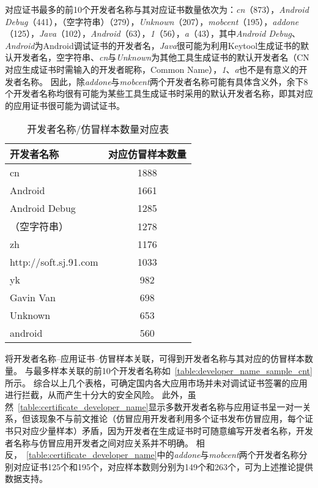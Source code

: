 对应证书最多的前10个开发者名称与其对应证书数量依次为：\emph{cn}（873），\emph{Android Debug}（441），（空字符串）（279），\emph{Unknown}（207），\emph{mobcent}（195），\emph{addone}（125），\emph{Java}（102），\emph{Android}（63），\emph{1}（56），\emph{a}（43），其中\emph{Android Debug}、\emph{Android}为Android调试证书的开发者名，\emph{Java}很可能为利用Keytool生成证书的默认开发者名，空字符串、\emph{cn}与\emph{Unknown}为其他工具生成证书的默认开发者名（CN对应生成证书时需输入的开发者昵称，Common Name），\emph{1}、\emph{a}也不是有意义的开发者名称。
因此，除\emph{addone}与\emph{mobcent}两个开发者名称可能有具体含义外，余下8个开发者名称均很有可能为某些工具生成证书时采用的默认开发者名称，即其对应的应用证书很可能为调试证书。

\begin{table}[htbp]
    \renewcommand{\arraystretch}{1}
    \footnotesize
    \centering
    \caption{开发者名称/仿冒样本数量对应表}
    \vspace{1mm}
    \begin{tabular}{l c}
        \toprule
        {\bf 开发者名称}      & {\bf 对应仿冒样本数量} \\
        \midrule
        cn                    & 1888                   \\
        Android               & 1661                   \\
        Android Debug         & 1285                   \\
        （空字符串）          & 1278                   \\
        zh                    & 1176                   \\
        http://soft.sj.91.com & 1033                   \\
        yk                    & 982                    \\
        Gavin Van             & 698                    \\
        Unknown               & 653                    \\
        android               & 560                    \\
        \bottomrule
    \end{tabular}
    \label{table:developer_name_sample_cnt}
\end{table}

将开发者名称--应用证书--仿冒样本关联，可得到开发者名称与其对应的仿冒样本数量。
与最多样本关联的前10个开发者名称如~\autoref{table:developer_name_sample_cnt}所示。
综合以上几个表格，可确定国内各大应用市场并未对调试证书签署的应用进行拦截，从而产生十分大的安全风险。
此外，虽然~\autoref{table:certificate_developer_name}显示多数开发者名称与应用证书呈一对一关系，但该现象不与前文推论（仿冒应用开发者利用多个证书发布仿冒应用，每个证书只对应少量样本）矛盾，因为开发者在生成证书时可随意编写开发者名称，开发者名称与仿冒应用开发者之间对应关系并不明确。
相反，~\autoref{table:certificate_developer_name}中的\emph{addone}与\emph{mobcent}两个开发者名称分别对应证书125个和195个，对应样本数则分别为149个和263个，可为上述推论提供数据支持。

